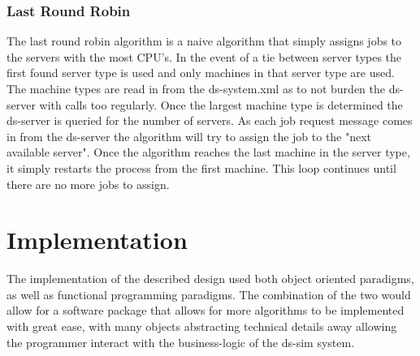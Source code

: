 \documentclass[a4paper]{article} %
\begin{document}
\subsubsection*{Last Round Robin}
The last round robin algorithm is a naive algorithm that simply assigns jobs to the servers with the most CPU's.
In the event of a tie between server types the first found server type is used and only machines in that server type are used.
The machine types are read in from the ds-system.xml as to not burden the ds-server with calls too regularly.
Once the largest machine type is determined the ds-server is queried for the number of servers. 
As each job request message comes in from the ds-server the algorithm will try to assign the job to the "next available server".
Once the algorithm reaches the last machine in the server type, it simply restarts the process from the first machine.
This loop continues until there are no more jobs to assign.

\section*{Implementation}
The implementation of the described design used both object oriented paradigms, as well as functional programming paradigms.
The combination of the two would allow for a software package that allows for more algorithms to be implemented with great ease, with many objects abstracting technical details away allowing the programmer interact with the business-logic of the ds-sim system.
\end{document}

